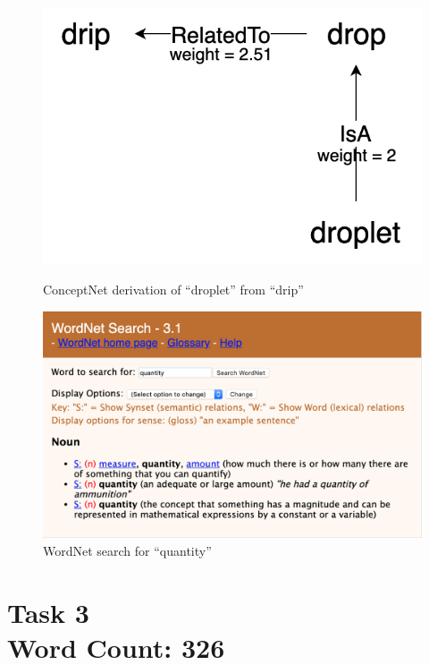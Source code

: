 \documentclass[12pt]{article}
\begin{document}
\begin{figure}[t]
    \begin{minipage}{0.49\textwidth}
        \centering
        \includegraphics[width=1\textwidth]{figs/concept.png}
        \caption{ConceptNet derivation of ``droplet'' from ``drip''}
        \label{figure:concept}
    \end{minipage}\hfill
    \begin{minipage}{0.49\textwidth}
       \centering
       \includegraphics[width=1\textwidth]{figs/synset.png}
       \caption{WordNet search for ``quantity''}
       \label{figure:quantity}
    \end{minipage}
\end{figure}

\vspace{0.5in}

\section*{Task 3 \\ \small Word Count: 326}
\end{document}
